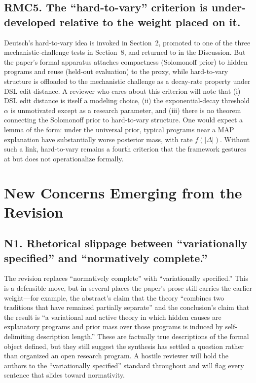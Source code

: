 \documentclass[11pt]{article}
\begin{document}
\subsection*{RMC5. The ``hard-to-vary'' criterion is under-developed relative to the weight placed on it.}

Deutsch's hard-to-vary idea is invoked in Section~2, promoted to one of the three mechanistic-challenge tests in Section~8, and returned to in the Discussion. But the paper's formal apparatus attaches compactness (Solomonoff prior) to hidden programs and reuse (held-out evaluation) to the proxy, while hard-to-vary structure is offloaded to the mechanistic challenge as a decay-rate property under DSL edit distance. A reviewer who cares about this criterion will note that (i) DSL edit distance is itself a modeling choice, (ii) the exponential-decay threshold $\alpha$ is unmotivated except as a research parameter, and (iii) there is no theorem connecting the Solomonoff prior to hard-to-vary structure. One would expect a lemma of the form: under the universal prior, typical programs near a MAP explanation have substantially worse posterior mass, with rate $f(|\Delta|)$. Without such a link, hard-to-vary remains a fourth criterion that the framework gestures at but does not operationalize formally.

\section*{New Concerns Emerging from the Revision}

\subsection*{N1. Rhetorical slippage between ``variationally specified'' and ``normatively complete.''}

The revision replaces ``normatively complete'' with ``variationally specified.'' This is a defensible move, but in several places the paper's prose still carries the earlier weight---for example, the abstract's claim that the theory ``combines two traditions that have remained partially separate'' and the conclusion's claim that the result is ``a variational and active theory in which hidden causes are explanatory programs and prior mass over those programs is induced by self-delimiting description length.'' These are factually true descriptions of the formal object defined, but they still suggest the synthesis has settled a question rather than organized an open research program. A hostile reviewer will hold the authors to the ``variationally specified'' standard throughout and will flag every sentence that slides toward normativity.
\end{document}
